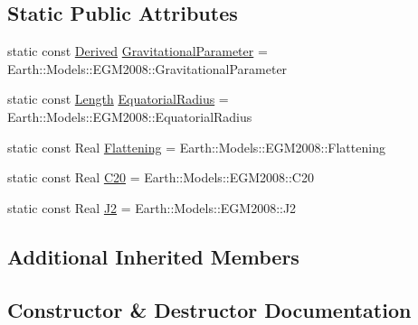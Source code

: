 \subsection*{Static Public Attributes}
\begin{DoxyCompactItemize}
\item 
static const \hyperlink{classlibrary_1_1physics_1_1units_1_1_derived}{Derived} \hyperlink{classlibrary_1_1physics_1_1env_1_1obj_1_1celest_1_1_earth_ab0600740956e984ea7a548a062d793f1}{Gravitational\+Parameter} = Earth\+::\+Models\+::\+E\+G\+M2008\+::\+Gravitational\+Parameter
\item 
static const \hyperlink{classlibrary_1_1physics_1_1units_1_1_length}{Length} \hyperlink{classlibrary_1_1physics_1_1env_1_1obj_1_1celest_1_1_earth_a55828a36604fb87c8232e5c542fd5fe1}{Equatorial\+Radius} = Earth\+::\+Models\+::\+E\+G\+M2008\+::\+Equatorial\+Radius
\item 
static const Real \hyperlink{classlibrary_1_1physics_1_1env_1_1obj_1_1celest_1_1_earth_aaba560b789bbcfe8d4e0a945a87218bb}{Flattening} = Earth\+::\+Models\+::\+E\+G\+M2008\+::\+Flattening
\item 
static const Real \hyperlink{classlibrary_1_1physics_1_1env_1_1obj_1_1celest_1_1_earth_ac23d264acdac73360807fff7ce11c2a7}{C20} = Earth\+::\+Models\+::\+E\+G\+M2008\+::\+C20
\item 
static const Real \hyperlink{classlibrary_1_1physics_1_1env_1_1obj_1_1celest_1_1_earth_a1a72d6717f224aad24853666d50fb8a1}{J2} = Earth\+::\+Models\+::\+E\+G\+M2008\+::\+J2
\end{DoxyCompactItemize}
\subsection*{Additional Inherited Members}


\subsection{Constructor \& Destructor Documentation}
\mbox{\label{classlibrary_1_1physics_1_1env_1_1obj_1_1celest_1_1_earth_a55336b7cddc00e54a9c0136deb09568f}} 
